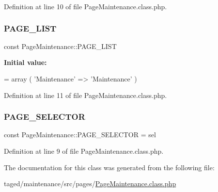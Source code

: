 Definition at line 10 of file Page\+Maintenance.\+class.\+php.

\mbox{\label{class_page_maintenance_ad6903242a92c1315d94dfc3c0a8413aa}} 
\subsubsection{\texorpdfstring{P\+A\+G\+E\+\_\+\+L\+I\+ST}{PAGE\_LIST}}
{\footnotesize\ttfamily const Page\+Maintenance\+::\+P\+A\+G\+E\+\_\+\+L\+I\+ST}

{\bfseries Initial value\+:}
\begin{DoxyCode}
= array (
        \textcolor{stringliteral}{'Maintenance'} => \textcolor{stringliteral}{'Maintenance'}
    )
\end{DoxyCode}


Definition at line 11 of file Page\+Maintenance.\+class.\+php.

\mbox{\label{class_page_maintenance_ae9d97a84bfec9996f5964b231ba5807f}} 
\subsubsection{\texorpdfstring{P\+A\+G\+E\+\_\+\+S\+E\+L\+E\+C\+T\+OR}{PAGE\_SELECTOR}}
{\footnotesize\ttfamily const Page\+Maintenance\+::\+P\+A\+G\+E\+\_\+\+S\+E\+L\+E\+C\+T\+OR = \textquotesingle{}sel\textquotesingle{}}



Definition at line 9 of file Page\+Maintenance.\+class.\+php.



The documentation for this class was generated from the following file\+:\begin{DoxyCompactItemize}
\item 
taged/maintenance/src/pages/\hyperlink{_page_maintenance_8class_8php}{Page\+Maintenance.\+class.\+php}\end{DoxyCompactItemize}
